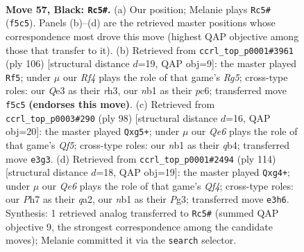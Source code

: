 \documentclass[11pt]{article}
\begin{document}
\clearpage

\begin{figure}[p]\centering
\begin{subfigure}{0.46\textwidth}\centering
\resizebox{\linewidth}{!}{%
\newchessgame
\chessboard[
  setfen={8/2k4p/8/p4r2/2K5/4q3/4P3/1N6 b - - 0 57},
  showmover=false,
  pgfstyle=straightmove, color=movearrow, markmove={f5-c5}
]}
\caption{}
\end{subfigure}\hfill
\begin{subfigure}{0.46\textwidth}\centering
\resizebox{\linewidth}{!}{%
\newchessgame
\chessboard[
  setfen={8/8/2p1k3/6RP/4P3/7r/5K2/8 w - - 0 54},
  showmover=false,
  pgfstyle=straightmove, color=movearrow, markmove={g5-f5}
]}
\caption{}
\end{subfigure}
\\[4pt]
\begin{subfigure}{0.46\textwidth}\centering
\resizebox{\linewidth}{!}{%
\newchessgame
\chessboard[
  setfen={8/6k1/8/5QpP/1q6/8/5PK1/8 w - - 2 50},
  showmover=false,
  pgfstyle=straightmove, color=movearrow, markmove={f5-g5}
]}
\caption{}
\end{subfigure}\hfill
\begin{subfigure}{0.46\textwidth}\centering
\resizebox{\linewidth}{!}{%
\newchessgame
\chessboard[
  setfen={8/8/6k1/8/5Qp1/6P1/q7/6K1 w - - 4 58},
  showmover=false,
  pgfstyle=straightmove, color=movearrow, markmove={f4-g4}
]}
\caption{}
\end{subfigure}
\caption{\textbf{Move 57, Black: \texttt{Rc5\#}.} (a) Our position; Melanie plays \texttt{Rc5\#} (\texttt{f5c5}). Panels (b)--(d) are the retrieved master positions whose correspondence most drove this move (highest QAP objective among those that transfer to it). (b) Retrieved from \texttt{ccrl\_top\_p0001\#3961} (ply 106) [structural distance $d$=19, QAP obj=9]: the master played \texttt{Rf5}; under $\mu$ our \emph{Rf4} plays the role of that game's \emph{Rg5}; cross-type roles: our \emph{Q}e3 as their \emph{r}h3, our \emph{n}b1 as their \emph{p}c6; transferred move \texttt{f5c5} \textbf{(endorses this move)}. (c) Retrieved from \texttt{ccrl\_top\_p0003\#290} (ply 98) [structural distance $d$=16, QAP obj=20]: the master played \texttt{Qxg5+}; under $\mu$ our \emph{Qe6} plays the role of that game's \emph{Qf5}; cross-type roles: our \emph{n}b1 as their \emph{q}b4; transferred move \texttt{e3g3}. (d) Retrieved from \texttt{ccrl\_top\_p0001\#2494} (ply 114) [structural distance $d$=18, QAP obj=19]: the master played \texttt{Qxg4+}; under $\mu$ our \emph{Qe6} plays the role of that game's \emph{Qf4}; cross-type roles: our \emph{P}h7 as their \emph{q}a2, our \emph{n}b1 as their \emph{P}g3; transferred move \texttt{e3h6}. Synthesis: 1 retrieved analog transferred to \texttt{Rc5\#} (summed QAP objective 9, the strongest correspondence among the candidate moves); Melanie committed it via the \texttt{search} selector.}
\label{fig:thought-m113}
\end{figure}
\end{document}
